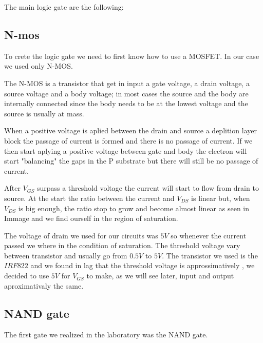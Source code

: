 \documentclass{article}
\begin{document}
The main logic gate are the following:



\subsection{N-mos}

To crete the logic gate we need to first know how to use a MOSFET. In our case we used only N-MOS. 

\vspace{3mm}

The N-MOS is a transistor that get in input a gate voltage, a drain voltage, a source voltage and a body voltage; in most cases the source and the body are internally connected since the body needs to be at the lowest voltage and the source is usually at mass.

When a positive voltage is aplied between the drain and source a deplition layer block the passage of current is formed and there is no passage of current. 
If we then start aplying a positive voltage between gate and body the electron will start "balancing" the gaps in the P substrate but there will still be no passage of current. 

After $V_{GS}$ surpass a threshold voltage the current will start to flow from drain to source. At the start the ratio between the current and $V_{DS}$ is linear but, when $V_{DS}$ is big enough, the ratio stop to grow and become almost linear as seen in Immage %
and we find ourself in the region of saturation.

\vspace{3mm}

The voltage of drain we used for our circuits was $5V$ so whenever the current passed we where in the condition of saturation.
The threshold voltage vary between transistor and usually go from $0.5V$ to $5V$. 
The transistor we used is the $IRF822$ and we found in lag that the threshold voltage is approssimatively %
, we decided to use $5V$ for $V_{GS}$ to make, as we will see later, input and output aproximativaly the same.



\subsection{NAND gate}

The first gate we realized in the laboratory was the NAND gate. 
\end{document}
